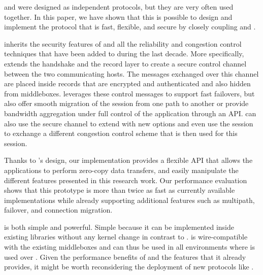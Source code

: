 \tcp and \tls were designed as independent protocols, but they are very often
used together. In this paper, we have shown that this is possible to design and
implement the \tcpls protocol that is fast, flexible, and secure by closely
coupling \tcp and \tls.

\tcpls inherits the security features of  and all the reliability and
congestion control techniques that have been added to \tcp during the last
decade. More specifically, \tcpls extends the  handshake and the record
layer to create a secure control channel between the two communicating hosts.
The messages exchanged over this channel are placed inside \tls records that are
encrypted and authenticated and also hidden from middleboxes. \tcpls leverages
these control messages to support fast failovers, but also offer smooth
migration of the \tcpls session from one path to another or provide bandwidth
aggregation under full control of the application through an API. \tcpls can
also use the secure channel to extend \tcp with new options and even use the
\tcpls session to exchange a different congestion control scheme that is then
used for this session.

Thanks to \tcpls's design, our \tcpls implementation provides a
flexible API that allows the applications to perform zero-copy data transfers,
and easily manipulate the different features presented in this research work.
Our performance evaluation shows that this prototype is more than twice as fast
as currently available \quic implementations while already supporting additional
features such as multipath, failover, and connection migration.

\tcpls is both simple and powerful. Simple because it can be implemented inside
existing \tls libraries without any kernel change in contrast to \tcp. \tcpls is
wire-compatible with the existing \tcp middleboxes and can thus be used in all
environments where \tls is used over \tcp. Given the performance benefits of
\tcpls and the features that it already provides, it might be worth
reconsidering the deployment of new protocols like \quic.
